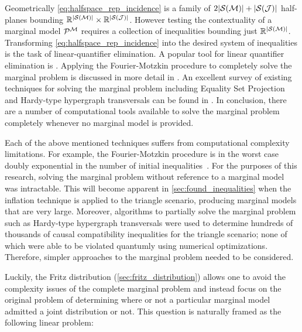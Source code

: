 \documentclass[aps, 10pt, english, twoside, pra, nofootinbib, tightenlines, longbibliography]{revtex4-1}
\renewcommand{\Events}[1]{\mathcal{S}\br{#1}} %
\begin{document}
    Geometrically \cref{eq:halfspace_rep_incidence} is a family of $2\abs{\Events{\mscenario}} + \abs{\Events{\jointvar}}$ half-planes bounding $\R^{\abs{\Events{\mscenario}}} \times \R^{\abs{\Events{\jointvar}}}$. However testing the contextuality of a marginal model $\probvec^{\mscenario}$ requires a collection of inequalities bounding just $\R^{\abs{\Events{\mscenario}}}$. Transforming \cref{eq:halfspace_rep_incidence} into the desired system of inequalities is the task of linear-quantifier elimination. A popular tool for linear quantifier elimination is  \cite{Dantzig_1973,Inflation,Abramsky_2012,jones_2004}. Applying the Fourier-Motzkin procedure to completely solve the marginal problem is discussed in more detail in \citet{Fritz_2011}. An excellent survey of existing techniques for solving the marginal problem including Equality Set Projection~\cite{jones_2004} and Hardy-type hypergraph transversals can be found in \citet{Inflation}. In conclusion, there are a number of computational tools available to solve the marginal problem completely whenever no marginal model is provided.

    Each of the above mentioned techniques suffers from computational complexity limitations. For example, the Fourier-Motzkin procedure is in the worst case doubly exponential in the number of initial inequalities~\cite{Dantzig_1973}. For the purposes of this research, solving the marginal problem without reference to a marginal model was intractable. This will become apparent in \cref{sec:found_inequalities} when the inflation technique is applied to the triangle scenario, producing marginal models that are very large. Moreover, algorithms to partially solve the marginal problem such as Hardy-type hypergraph transversals were used to determine hundreds of thousands of causal compatibility inequalities for the triangle scenario; none of which were able to be violated quantumly using numerical optimizations. Therefore, simpler approaches to the marginal problem needed to be considered.

    Luckily, the Fritz distribution (\cref{sec:fritz_distribution}) allows one to avoid the complexity issues of the complete marginal problem and instead focus on the original problem of determining where or not a particular marginal model admitted a joint distribution or not. This question is naturally framed as the following linear problem:
\end{document}
